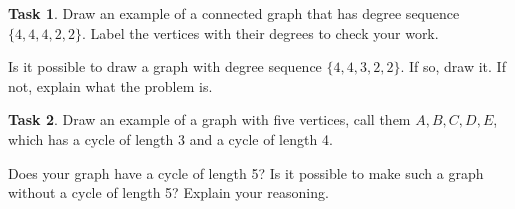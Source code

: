 \documentclass[12pt,letterpaper]{article}
\theoremstyle{definition}
\newtheorem{task}{Task}
\begin{document}
\begin{task}
Draw an example of a connected graph that has degree sequence $\{4,4,4,2,2 \}$. Label the vertices with their degrees to check your work.

Is it possible to draw a graph with degree sequence $\{4,4,3,2,2\}$. If so, draw it. If not, explain what the problem is.
\end{task}

\begin{task}
Draw an example of a graph with five vertices, call them $A, B, C, D, E$, which has a cycle of length 3 and a cycle of length 4.

Does your graph have a cycle of length 5? Is it possible to make such a graph without a cycle of length 5? Explain your reasoning.
\end{task}
\end{document}
